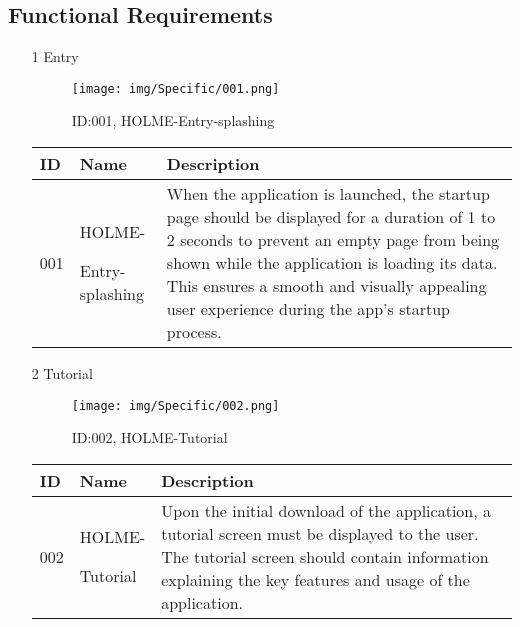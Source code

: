 \documentclass[conference]{IEEEtran}
\begin{document}
\subsection{Functional Requirements}
\begin{enumerate}
\item[1] Entry
\begin{figure}[h]
\centering
\texttt{[image: img/Specific/001.png]}
\caption{ID:001, HOLME-Entry-splashing}
\end{figure}

\begin{table}[h]
\def\arraystretch{1.2} \small
    \begin{tabular}{|p{1cm}|p{1.8cm}|p{5.0cm}|}
        \hline
        ID & Name & Description\\ \hline
         001 \par  & HOLME-\par Entry-splashing & When the application is launched, the startup page should be displayed for a duration of 1 to 2 seconds to prevent an empty page from being shown while the application is loading its data. This ensures a smooth and visually appealing user experience during the app's startup process.\\ \hline
    \end{tabular}
\end{table}

\item[2] Tutorial\\

\begin{figure}[h]
\centering
\texttt{[image: img/Specific/002.png]}
\caption{ID:002, HOLME-Tutorial}
\end{figure}
\begin{table}[h]
\def\arraystretch{1.2} \small
    \begin{tabular}{|p{1cm}|p{1.8cm}|p{5.0cm}|}
        \hline
        ID & Name & Description\\ \hline
         002 \par  & HOLME-\par Tutorial &Upon the initial download of the application, a tutorial screen must be displayed to the user. The tutorial screen should contain information explaining the key features and usage of the application.\\ \hline
    \end{tabular}
\end{table}


\end{enumerate}
\end{document}
